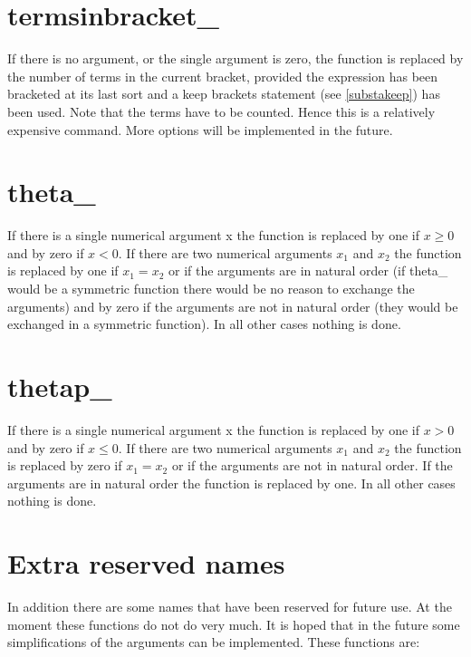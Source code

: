 \section{termsinbracket\_}
\label{funtermsinbracket}
\noindent If there is no argument, or the single argument is zero, the 
function is replaced by the number of terms in the current 
bracket, provided the expression has been bracketed at its 
last sort and a keep brackets statement (see \ref{substakeep}) has been 
used. Note that the terms have to be counted. Hence this is a relatively 
expensive command. More options will be implemented in the future.

\section{theta\_}
\label{funtheta}
\noindent If there is a single numerical argument x the function is 
replaced by one if $x \ge 0$ and by zero if $x < 0$. If there are two 
numerical arguments $x_1$ and $x_2$ the function is replaced by one if $x_1 
= x_2$ or if the arguments are in natural order (if theta\_ would be a 
symmetric function there would be no reason to exchange the arguments) and 
by zero if the arguments are not in natural order (they would be exchanged 
in a symmetric function). In all other cases nothing is done.

\section{thetap\_}
\label{funthetap}
\noindent If there is a single numerical argument x the function is 
replaced by one if $x > 0$ and by zero if $x \le 0$. If there are two 
numerical arguments $x_1$ and $x_2$ the function is replaced by zero if $x_1 
= x_2$ or if the arguments are not in natural order. If the arguments are 
in natural order the function is replaced by one. In all other cases 
nothing is done.

\section{Extra reserved names}

\noindent In addition there are some names that have been reserved for 
future use. At the moment these functions do not do very much. It is hoped 
that in the future some simplifications of the arguments can be 
implemented. These functions are:

